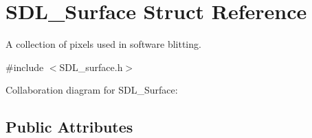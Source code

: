 \hypertarget{struct_s_d_l___surface}{}\section{S\+D\+L\+\_\+\+Surface Struct Reference}
\label{struct_s_d_l___surface}


A collection of pixels used in software blitting.  




{\ttfamily \#include $<$S\+D\+L\+\_\+surface.\+h$>$}



Collaboration diagram for S\+D\+L\+\_\+\+Surface\+:
\subsection*{Public Attributes}
